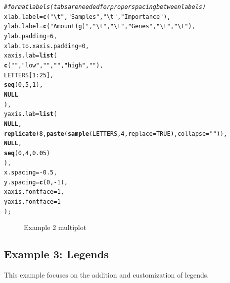 \documentclass[letterpaper]{report}\usepackage[]{graphicx}\usepackage[]{color}
\makeatletter
\newcommand{\hlnum}[1]{\textcolor[rgb]{0.686,0.059,0.569}{#1}}%
\newcommand{\hlstr}[1]{\textcolor[rgb]{0.192,0.494,0.8}{#1}}%
\newcommand{\hlcom}[1]{\textcolor[rgb]{0.678,0.584,0.686}{\textit{#1}}}%
\newcommand{\hlopt}[1]{\textcolor[rgb]{0,0,0}{#1}}%
\newcommand{\hlstd}[1]{\textcolor[rgb]{0.345,0.345,0.345}{#1}}%
\newcommand{\hlkwa}[1]{\textcolor[rgb]{0.161,0.373,0.58}{\textbf{#1}}}%
\newcommand{\hlkwc}[1]{\textcolor[rgb]{0.333,0.667,0.333}{#1}}%
\newcommand{\hlkwd}[1]{\textcolor[rgb]{0.737,0.353,0.396}{\textbf{#1}}}%
\newenvironment{kframe}{%
 \def\at@end@of@kframe{}%
 \ifinner\ifhmode%
  \def\at@end@of@kframe{\end{minipage}}%
  \begin{minipage}{\columnwidth}%
 \fi\fi%
 \def\FrameCommand##1{\hskip\@totalleftmargin \hskip-\fboxsep
 \colorbox{shadecolor}{##1}\hskip-\fboxsep
     \hskip-\linewidth \hskip-\@totalleftmargin \hskip\columnwidth}%
 \MakeFramed {\advance\hsize-\width
   \@totalleftmargin\z@ \linewidth\hsize
   \@setminipage}}%
 {\par\unskip\endMakeFramed%
 \at@end@of@kframe}
\newenvironment{knitrout}{}{} %
\makeatother
\begin{document}
\begin{knitrout}
\begin{kframe}
\begin{alltt}
    \hlcom{# format labels (tabs are needed for proper spacing between labels)}
    \hlkwc{xlab.label} \hlstd{=} \hlkwd{c}\hlstd{(}\hlstr{"\textbackslash{}t"}\hlstd{,} \hlstr{"Samples"}\hlstd{,} \hlstr{"\textbackslash{}t"}\hlstd{,} \hlstr{"    Importance"}\hlstd{),}
    \hlkwc{ylab.label} \hlstd{=} \hlkwd{c}\hlstd{(} \hlstr{"Amount (g)"}\hlstd{,} \hlstr{"\textbackslash{}t"}\hlstd{,} \hlstr{"\textbackslash{}t"}\hlstd{,} \hlstr{"Genes"}\hlstd{,} \hlstr{"\textbackslash{}t"}\hlstd{,} \hlstr{"\textbackslash{}t"}\hlstd{),}
    \hlkwc{ylab.padding} \hlstd{=} \hlnum{6}\hlstd{,}
    \hlkwc{xlab.to.xaxis.padding} \hlstd{=} \hlnum{0}\hlstd{,}
    \hlkwc{xaxis.lab} \hlstd{=} \hlkwd{list}\hlstd{(}
        \hlkwd{c}\hlstd{(}\hlstr{""}\hlstd{,}\hlstr{"low"}\hlstd{,}\hlstr{""}\hlstd{,} \hlstr{""}\hlstd{,}\hlstr{"high"}\hlstd{,} \hlstr{""}\hlstd{),}
        \hlstd{LETTERS[}\hlnum{1}\hlopt{:}\hlnum{25}\hlstd{],}
        \hlkwd{seq}\hlstd{(}\hlnum{0}\hlstd{,}\hlnum{5}\hlstd{,}\hlnum{1}\hlstd{),}
        \hlkwa{NULL}
        \hlstd{),}
    \hlkwc{yaxis.lab} \hlstd{=} \hlkwd{list}\hlstd{(}
        \hlkwa{NULL}\hlstd{,}
        \hlkwd{replicate}\hlstd{(}\hlnum{8}\hlstd{,} \hlkwd{paste}\hlstd{(}\hlkwd{sample}\hlstd{(LETTERS,} \hlnum{4}\hlstd{,} \hlkwc{replace} \hlstd{=} \hlnum{TRUE}\hlstd{),} \hlkwc{collapse} \hlstd{=} \hlstr{""}\hlstd{)),}
        \hlkwa{NULL}\hlstd{,}
        \hlkwd{seq}\hlstd{(}\hlnum{0}\hlstd{,}\hlnum{4}\hlstd{,}\hlnum{0.05}\hlstd{)}
        \hlstd{),}
    \hlkwc{x.spacing} \hlstd{=} \hlopt{-}\hlnum{0.5}\hlstd{,}
    \hlkwc{y.spacing} \hlstd{=} \hlkwd{c}\hlstd{(}\hlnum{0}\hlstd{,} \hlopt{-}\hlnum{1}\hlstd{),}
    \hlkwc{xaxis.fontface} \hlstd{=} \hlnum{1}\hlstd{,}
    \hlkwc{yaxis.fontface} \hlstd{=} \hlnum{1}
    \hlstd{);}
\end{alltt}
\end{kframe}\begin{figure}

{\centering {} 

}

\caption[Example 2 multiplot]{Example 2 multiplot}\label{fig:multiplotex2_final}
\end{figure}


\end{knitrout}

\subsection{Example 3: Legends}
This example focuses on the addition and customization of legends.
\end{document}

